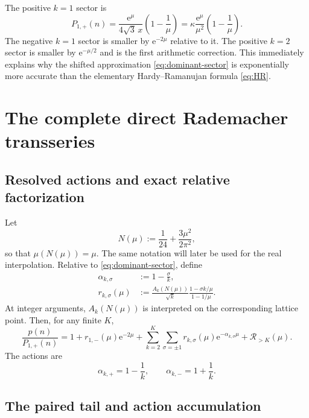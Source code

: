 \documentclass[11pt,a4paper]{article}
\numberwithin{equation}{section}
\theoremstyle{definition}
\theoremstyle{remark}
\newcommand{\e}{\mathrm e}
\newcommand{\Rcal}{\mathcal R}
\begin{document}
The positive $k=1$ sector is
\begin{equation}\label{eq:dominant-sector}
 P_{1,+}(n)=\frac{\e^\mu}{4\sqrt3\,x}
 \left(1-\frac1\mu\right)
 =\kappa\frac{\e^\mu}{\mu^2}\left(1-\frac1\mu\right).
\end{equation}
The negative $k=1$ sector is smaller by $\e^{-2\mu}$ relative to it.  The
positive $k=2$ sector is smaller by $\e^{-\mu/2}$ and is the first arithmetic
correction.  This immediately explains why the shifted approximation
\eqref{eq:dominant-sector} is exponentially more accurate than the elementary
Hardy--Ramanujan formula \eqref{eq:HR}.

\section{The complete direct Rademacher transseries}

\subsection{Resolved actions and exact relative factorization}

Let
\begin{equation}\label{eq:N-of-mu}
 N(\mu):=\frac1{24}+\frac{3\mu^2}{2\pi^2},
\end{equation}
so that $\mu(N(\mu))=\mu$.  The same notation will later be used for the real
interpolation.  Relative to \eqref{eq:dominant-sector}, define
\begin{align}
 \alpha_{k,\sigma}&:=1-\frac{\sigma}{k},
 \label{eq:actions}\\
 r_{k,\sigma}(\mu)&:=
 \frac{A_k(N(\mu))}{\sqrt{k}}
 \frac{1-\sigma k/\mu}{1-1/\mu}.
 \label{eq:rks}
\end{align}
At integer arguments, $A_k(N(\mu))$ is interpreted on the corresponding
lattice point.  Then, for any finite $K$,
\begin{equation}\label{eq:finite-resolved}
 \frac{p(n)}{P_{1,+}(n)}
 =1+r_{1,-}(\mu)\e^{-2\mu}
 +\sum_{k=2}^{K}\sum_{\sigma=\pm1}
 r_{k,\sigma}(\mu)\e^{-\alpha_{k,\sigma}\mu}
 +\Rcal_{>K}(\mu).
\end{equation}
The actions are
\begin{equation}\label{eq:action-list}
 \alpha_{k,+}=1-\frac1k,\qquad
 \alpha_{k,-}=1+\frac1k.
\end{equation}

\subsection{The paired tail and action accumulation}
\end{document}
